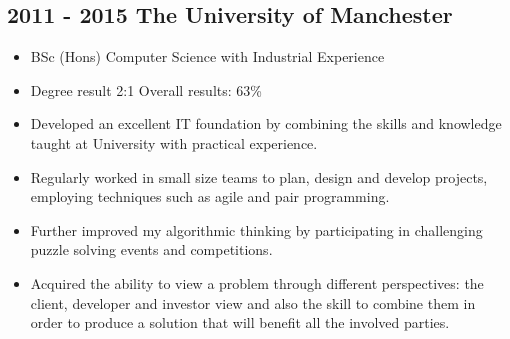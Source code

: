 \documentclass[12pt,a4paper]{res}
\begin{document}
\begin{resume}
\section{\bf 2011 - 2015 \hspace{1.5mm}The University of Manchester}
  
  \begin{itemize} %
     \item[] BSc (Hons) Computer Science  with Industrial Experience
     \item[] Degree result 2:1 \hspace{10mm}Overall results: 63\% 

     \item Developed an excellent IT foundation by combining the skills and knowledge taught
     at University with practical experience.
     \item Regularly worked in small size teams to plan, design and develop projects,   employing techniques such as agile and pair programming.
     \item Further improved my algorithmic thinking by participating in challenging puzzle solving events and competitions.
     \item Acquired the ability to view a problem through different perspectives: the client, developer and investor view and also the skill to combine them in order to produce a solution that will benefit all the involved parties.
   \end{itemize}


\end{resume}
\end{document}
